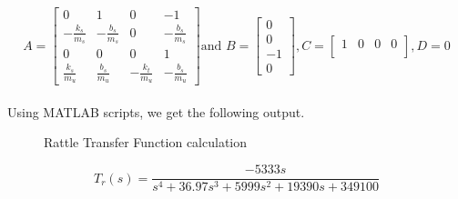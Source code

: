 \documentclass[12pt, a4paper, oneside]{report}
\begin{document}
    \begin{equation}
        A = \begin{bmatrix}
            0 & 1 & 0 & -1 \\
            -\frac{k_s}{m_s} & -\frac{b_s}{m_s} & 0 & -\frac{b_s}{m_s} \\
            0 & 0 & 0 & 1 \\
            \frac{k_s}{m_u} & \frac{b_s}{m_u} & -\frac{k_t}{m_u} & -\frac{b_s}{m_u}
        \end{bmatrix} \text{and } B = \begin{bmatrix}
            0 \\
            0 \\
            -1 \\
            0
        \end{bmatrix} 
        ,C = \begin{bmatrix}
            1 & 0 & 0 & 0 \\
        \end{bmatrix}
        ,D = 0
        \nonumber
\end{equation}
\\
    Using MATLAB scripts, we get the following output.

\begin{figure}[H]
    \centering
    
    \hfill
    \par 
    \caption{Rattle Transfer Function calculation}
    \label{fig: open_loop2}
\end{figure}

\begin{equation}
    \label{eq:open_loop2}
    T_r(s) = \frac{ -5333 s}{s^4 + 36.97 s^3 + 5999 s^2 + 19390 s + 349100}
\end{equation}
\end{document}
